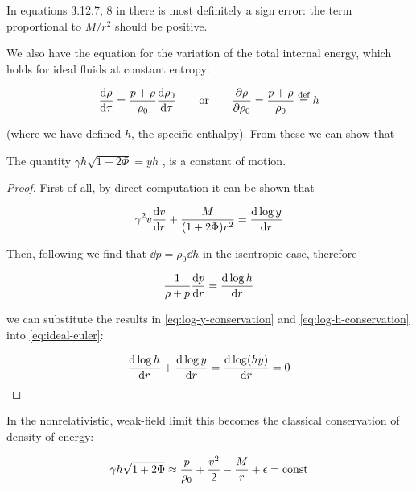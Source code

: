 \documentclass[main.tex]{subfiles}
\begin{document}
\begin{greenbox}
  In equations 3.12.7, 8 in \cite{Nobili:2000} there is most definitely a sign error: the term proportional to \(M/r^2\) should be positive.
\end{greenbox}

We also have the equation for the variation of the total internal energy, which holds for ideal fluids at constant entropy:

\begin{equation} \label{eq:enthalpy-definition}
    \dv{\rho}{\tau} = \frac{p+\rho}{\rho_0} \dv{\rho_0}{\tau}
    \qquad
    \text{or}
    \qquad
    \pdv{\rho}{\rho_0} = \frac{p + \rho}{\rho_0} \defeq h
\end{equation}

(where we have defined $h$, the specific enthalpy).
From these we can show that

\begin{claim}
The quantity $\gamma h \sqrt{1+2\Phi} = yh$ , is a constant of motion.
\end{claim}

\begin{proof}
First of all, by direct computation it can be shown that

\begin{equation} \label{eq:log-y-conservation}
  \gamma^2 v \dv{v}{r} + \frac{M}{(1+ 2 \Phi) r^2} = \dv{\log y }{r}
\end{equation}

Then, following \textcite[section 6.3]{Gourgoulhon:2006bn} we find that \(\dd{p} = \rho_0 \dd{h}\) in the isentropic case, therefore

\begin{equation} \label{eq:log-h-conservation}
  \frac{1}{\rho + p} \dv{p}{r}  =  \dv{\log h}{r}
\end{equation}

we can substitute the results in \eqref{eq:log-y-conservation} and \eqref{eq:log-h-conservation} into \eqref{eq:ideal-euler}:

\begin{equation}
  \dv{\log h}{r} + \dv{\log y }{r} = \dv{\log (hy) }{r} = 0
\end{equation}

\end{proof}

In the nonrelativistic, weak-field limit this  becomes the classical conservation of density of energy:

\begin{equation}
    \gamma h \sqrt{1+2\Phi} \approx \frac{p}{\rho_0} + \frac{v^2}{2} - \frac{M}{r} + \epsilon = \const
\end{equation}
\end{document}
